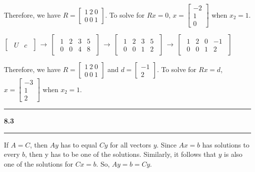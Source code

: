 \documentclass[11pt]{article}
\newcommand\question[2]{\vspace{.25in}\hrule\textbf{#1 #2}\vspace{.5em}\hrule\vspace{.10in}}
\begin{document}
Therefore, we have \(R = \begin{bmatrix} 1 \ 2 \ 0 \\ 0 \ 0 \ 1 \end{bmatrix}\). To solve for \(Rx = 0\), \(x = \begin{bmatrix} -2 \\ 1 \\ 0 \end{bmatrix}\) when \(x_2 = 1\).

\(\begin{bmatrix}\begin{array}{c|c} U & c \end{array}\end{bmatrix}\,\to\,\begin{bmatrix}\begin{array}{ccc|c} 1&2&3&5 \\ 0&0&4&8 \end{array}\end{bmatrix}\,\to\,\begin{bmatrix}\begin{array}{ccc|c} 1&2&3&5 \\ 0&0&1&2 \end{array}\end{bmatrix}\,\to\,\begin{bmatrix}\begin{array}{ccc|c} 1&2&0&-1 \\ 0&0&1&2 \end{array}\end{bmatrix}\)

Therefore, we have \(R = \begin{bmatrix} 1 \ 2 \ 0 \\ 0 \ 0 \ 1 \end{bmatrix}\) and \(d = \begin{bmatrix} -1 \\ 2 \end{bmatrix}\). To solve for \(Rx = d\), \(x = \begin{bmatrix} -3 \\ 1 \\ 2 \end{bmatrix}\) when \(x_2 = 1\).

\question{8.3}{}
If \(A = C\), then \(Ay\) has to equal \(Cy\) for all vectors \(y\). Since \(Ax = b\) has solutions to every \(b\), then y has to be one of the solutions. Similarly, it follows that \(y\) is also one of the solutions for \(Cx = b\). So, \(Ay = b = Cy\).
\end{document}
